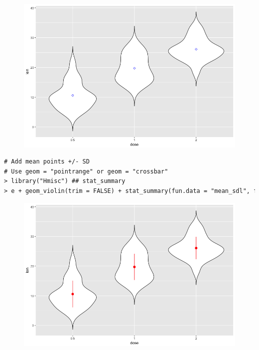 \begin{figure}[H]\begin{center}\includegraphics[scale=1 ]{ilu/bg92.png}\end{center}\end{figure}
\begin{lstlisting}[language=html]
# Add mean points +/- SD
# Use geom = "pointrange" or geom = "crossbar"
> library("Hmisc") ## stat_summary
> e + geom_violin(trim = FALSE) + stat_summary(fun.data = "mean_sdl", fun.args = list(mult = 1), geom = "pointrange", color = "red")
\end{lstlisting}
\begin{figure}[H]\begin{center}\includegraphics[scale=1 ]{ilu/bg93.png}\end{center}\end{figure}



